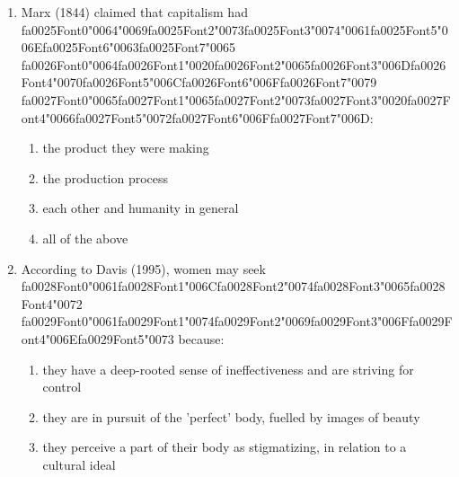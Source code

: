 \documentclass[12pt]{article}
\begin{document}
\begin{enumerate}[label=\arabic*.]
\begin{enumerate}[label=(\alph*)]
    \item Esquires, Serjeants of Law, Dukes' Eldest Sons
    \item King's Grandsons, Lord High Treasurer, Companions of the Bath
\end{enumerate}
\item Marx (1844) claimed that capitalism had {\csname fa0025Font0\endcsname\char"0064}{\char"0069}{\csname fa0025Font2\endcsname\char"0073}{\csname fa0025Font3\endcsname\char"0074}{\char"0061}{\csname fa0025Font5\endcsname\char"006E}{\csname fa0025Font6\endcsname\char"0063}{\csname fa0025Font7\endcsname\char"0065} {\csname fa0026Font0\endcsname\char"0064}{\csname fa0026Font1\endcsname\char"0020}{\csname fa0026Font2\endcsname\char"0065}{\csname fa0026Font3\endcsname\char"006D}{\csname fa0026Font4\endcsname\char"0070}{\csname fa0026Font5\endcsname\char"006C}{\csname fa0026Font6\endcsname\char"006F}{\csname fa0026Font7\endcsname\char"0079} {\csname fa0027Font0\endcsname\char"0065}{\csname fa0027Font1\endcsname\char"0065}{\csname fa0027Font2\endcsname\char"0073}{\csname fa0027Font3\endcsname\char"0020}{\csname fa0027Font4\endcsname\char"0066}{\csname fa0027Font5\endcsname\char"0072}{\csname fa0027Font6\endcsname\char"006F}{\csname fa0027Font7\endcsname\char"006D}:
\begin{enumerate}[label=(\alph*)]
    \item the product they were making
    \item the production process
    \item each other and humanity in general
    \item all of the above
\end{enumerate}
\item According to Davis (1995), women may seek {\csname fa0028Font0\endcsname\char"0061}{\csname fa0028Font1\endcsname\char"006C}{\csname fa0028Font2\endcsname\char"0074}{\csname fa0028Font3\endcsname\char"0065}{\csname fa0028Font4\endcsname\char"0072} {\csname fa0029Font0\endcsname\char"0061}{\csname fa0029Font1\endcsname\char"0074}{\csname fa0029Font2\endcsname\char"0069}{\csname fa0029Font3\endcsname\char"006F}{\csname fa0029Font4\endcsname\char"006E}{\csname fa0029Font5\endcsname\char"0073} because:
\begin{enumerate}[label=(\alph*)]
    \item they have a deep-rooted sense of ineffectiveness and are striving for control
    \item they are in pursuit of the 'perfect' body, fuelled by images of beauty
    \item they perceive a part of their body as stigmatizing, in relation to a cultural ideal

\end{enumerate}
\end{enumerate}
\end{document}
